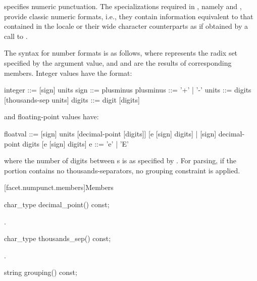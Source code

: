 \pnum
{}
specifies numeric punctuation.
The specializations required in , namely
and
,
provide classic
numeric formats,
i.e., they contain information equivalent to that contained in the
locale or their wide character counterparts as if obtained by
a call to
.

\pnum
The syntax for number formats is as follows, where
represents the radix set specified by the
argument value, and
and
are the results of corresponding
members.
Integer values have the format:
\begin{codeblock}
integer   ::= [sign] units
sign      ::= plusminus
plusminus ::= '+' | '-'
units     ::= digits [thousands-sep units]
digits    ::= digit [digits]
\end{codeblock}
and floating-point values have:
\begin{codeblock}
floatval ::= [sign] units [decimal-point [digits]] [e [sign] digits] |
             [sign]        decimal-point  digits   [e [sign] digits]
e        ::= 'e' | 'E'
\end{codeblock}
where the number of digits between
s
is as specified by
.
For parsing, if the
portion contains no thousands-separators, no grouping constraint
is applied.

[facet.numpunct.members]{Members}

%
\begin{itemdecl}
char_type decimal_point() const;
\end{itemdecl}

\begin{itemdescr}
\pnum
\returns
{}.
\end{itemdescr}

%
\begin{itemdecl}
char_type thousands_sep() const;
\end{itemdecl}

\begin{itemdescr}
\pnum
\returns
{}.
\end{itemdescr}

%
\begin{itemdecl}
string grouping()  const;
\end{itemdecl}

